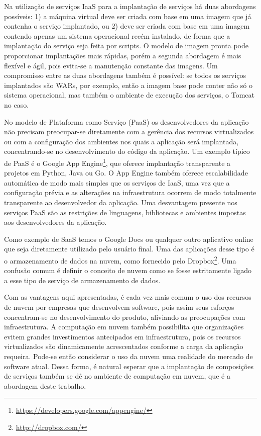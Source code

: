 Na utilização de serviços IaaS para a implantação de serviços há duas abordagens possíveis:
1) a máquina virtual deve ser criada com base em uma imagem que já contenha
o serviço implantado, ou 2) deve ser criada com base em uma imagem contendo apenas um
sistema operacional recém instalado, de forma que a implantação do serviço seja feita
por scripts. O modelo de imagem pronta pode proporcionar implantações mais rápidas,
porém a segunda abordagem é mais flexível e ágil, pois evita-se a manutenção constante
das imagens. Um compromisso entre as duas abordagens também é possível:
se todos os serviços implantados são WARs, por exemplo, então a imagem base
pode conter não só o sistema operacional, mas também o ambiente de execução
dos serviços, o Tomcat no caso.

No modelo de Plataforma como Serviço (PaaS) os desenvolvedores da aplicação não precisam preocupar-se diretamente com a gerência dos recursos virtualizados ou com a configuração dos ambientes nos quais a aplicação será implantada, concentrando-se no desenvolvimento do código da aplicação.
Um exemplo típico de PaaS é o Google App Engine\footnote{\url{https://developers.google.com/appengine/}}, que oferece implantação transparente a projetos em Python, Java ou Go. O App Engine também oferece escalabilidade automática de modo mais simples que os serviços de IaaS, uma vez que a configuração prévia e as alterações na infraestrutura ocorrem de modo totalmente transparente ao desenvolvedor da aplicação. Uma desvantagem presente nos serviços PaaS são as restrições de linguagens, bibliotecas e ambientes impostas aos desenvolvedores da aplicação.

Como exemplo de SaaS temos o Google Docs ou qualquer outro aplicativo online que seja diretamente utilizado pelo usuário final. Uma das aplicações desse tipo é o armazenamento de dados na nuvem, como fornecido pelo Dropbox\footnote{\url{http://dropbox.com/}}. Uma confusão comum é definir o conceito de nuvem como se fosse estritamente ligado a esse tipo de serviço de armazenamento de dados.

Com as vantagens aqui apresentadas, é cada vez mais comum o uso dos recursos de nuvem por empresas que desenvolvem software, pois assim seus esforços concentram-se no desenvolvimento do produto, aliviando as preocupações com infraestrutura. A computação em nuvem também possibilita que organizações evitem grandes investimentos antecipados em infraestrutura, pois os recursos virtualizados são dinamicamente acrescentados conforme a carga da aplicação requeira. Pode-se então considerar o uso da nuvem uma realidade do mercado de software atual. Dessa forma, é natural esperar que a implantação de composições de serviços também se dê no ambiente de computação em nuvem, que é a abordagem deste trabalho. 

